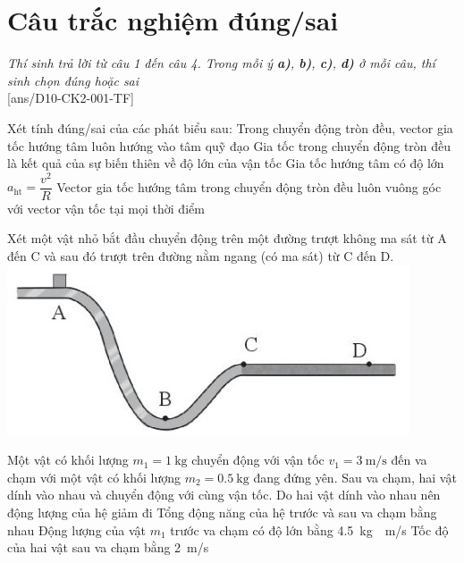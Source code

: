 \section{Câu trắc nghiệm đúng/sai} 
\textit{Thí sinh trả lời từ câu 1 đến câu 4. Trong mỗi ý \textbf{a)}, \textbf{b)}, \textbf{c)}, \textbf{d)} ở mỗi câu, thí sinh chọn đúng hoặc sai}
\setcounter{ex}{0}\\
[ans/D10-CK2-001-TF]
\begin{ex}
	Xét tính đúng/sai của các phát biểu sau:
	\choiceTF
	{\True Trong chuyển động tròn đều, vector gia tốc hướng tâm luôn hướng vào tâm quỹ đạo}
	{Gia tốc trong chuyển động tròn đều là kết quả của sự biến thiên về độ lớn của vận tốc}
	{\True Gia tốc hướng tâm có độ lớn $a_{\mathrm{ht}}=\dfrac{v^2}{R}$}
	{\True Vector gia tốc hướng tâm trong chuyển động tròn đều luôn vuông góc với vector vận tốc tại mọi thời điểm}
	\loigiai{}
\end{ex}
\begin{ex}
	Xét một vật nhỏ bắt đầu chuyển động trên một đường trượt không ma sát từ A đến C và sau đó trượt trên đường nằm ngang (có ma sát) từ C đến D.
	{\includegraphics[scale=0.6]{../figs/D10-CK2-001-8}}
	\loigiai{}
\end{ex}
\begin{ex}
	Một vật có khối lượng $m_1=\SI{1}{\kilogram}$ chuyển động với vận tốc $v_1=\SI{3}{\meter/\second}$ đến va chạm với một vật có khối lượng $m_2=\SI{0.5}{\kilogram}$ đang đứng yên. Sau va chạm, hai vật dính vào nhau và chuyển động với cùng vận tốc.
	\choice
	{Do hai vật dính vào nhau nên động lượng của hệ giảm đi}
	{Tổng động năng của hệ trước và sau va chạm bằng nhau}
	{Động lượng của vật $m_1$ trước va chạm có độ lớn bằng \SI{4.5}{\kilogram\cdot\meter/\second}}
	{\True Tốc độ của hai vật sau va chạm bằng \SI{2}{\meter/\second}}
	\loigiai{}
\end{ex}
